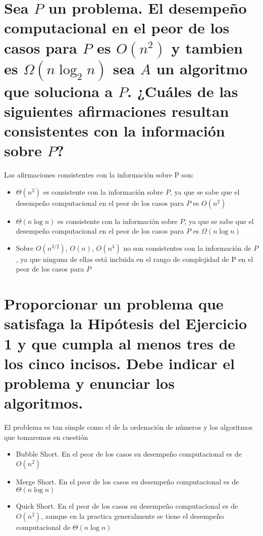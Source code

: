 \section{Sea $P$ un problema. El desempeño computacional en el peor de los casos para $P$ es $O(n^2)$ y tambien es $\Omega (n \log_2 n)$ sea $A$
  un algoritmo que soluciona a $P$. ¿Cuáles de las siguientes afirmaciones resultan consistentes con la información sobre $P$?}

Las afirmaciones consistentes con la información sobre P son:\\

\begin{itemize}
	\item $\Theta (n^2)$ es consistente con la información sobre $P$, ya que se sabe que el desempeño computacional en el peor de los casos para $P$ es $O(n^2)$
	\item $\Theta (n \log n)$ es consistente con la información sobre $P$, ya que se sabe que el desempeño computacional en el peor de los casos para $P$ es
	      $\Omega (n \log n)$
	\item Sobre $O (n^{3/2})$, $O(n)$, $O(n^3)$ no son consistentes con la información de $P$, ya que ninguna de ellas está incluida en el rango de complejidad
	      de P en el peor de los casos para $P$
\end{itemize}

\section{Proporcionar un problema que satisfaga la Hipótesis del Ejercicio 1 y que cumpla al
	menos tres de los cinco incisos. Debe indicar el problema y enunciar los algoritmos.}

El problema es tan simple como el de la ordenación de números y los algoritmos que tomaremos en cuestión\\

\begin{itemize}
	\item Bubble Short. En el peor de los casos su desempeño computacional es de  $O(n^2)$
	\item Merge Short. En el peor de los casos su desempeño computacional es de $\Theta(n \log n)$
	\item Quick Short. En el peor de los casos su desempeño computacional es de $O(n^2)$, aunque en la practica generalmente se tiene el desempeño computacional de $\Theta (n \log n)$
\end{itemize}

